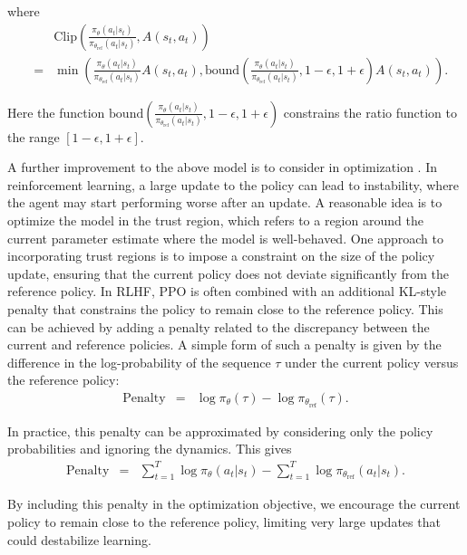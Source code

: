 \noindent where
\begin{eqnarray}
& & \mathrm{Clip}\left( \frac{\pi_{\theta}(a_t|s_t)}{\pi_{\theta_{\mathrm{ref}}}(a_t|s_t)}, A(s_t,a_t)\right) \nonumber \\
& = &  \min\left( \frac{\pi_{\theta}(a_t|s_t)}{\pi_{\theta_{\mathrm{ref}}}(a_t|s_t)} A(s_t,a_t),\mathrm{bound} \left(\frac{\pi_{\theta}(a_t|s_t)}{\pi_{\theta_{\mathrm{ref}}}(a_t|s_t)}, 1 - \epsilon, 1 + \epsilon \right) A(s_t,a_t) \right).
\end{eqnarray}

\noindent Here the function $\mathrm{bound}(\frac{\pi_{\theta}(a_t|s_t)}{\pi_{\theta_{\mathrm{ref}}}(a_t|s_t)}, 1 - \epsilon, 1 + \epsilon)$ constrains the ratio function to the range $[1-\epsilon, 1+\epsilon]$.

A further improvement to the above model is to consider  in optimization \cite{schulman-etal:2015trust}. In reinforcement learning, a large update to the policy can lead to instability, where the agent may start performing worse after an update. A reasonable idea is to optimize the model in the trust region, which refers to a region around the current parameter estimate where the model is well-behaved. One approach to incorporating trust regions is to impose a constraint on the size of the policy update, ensuring that the current policy does not deviate significantly from the reference policy. In RLHF, PPO is often combined with an additional KL-style penalty that constrains the policy to remain close to the reference policy. This can be achieved by adding a penalty related to the discrepancy between the current and reference policies. A simple form of such a penalty is given by the difference in the log-probability of the sequence $\tau$ under the current policy versus the reference policy:
\begin{eqnarray}
\mathrm{Penalty} & = & \log \pi_{\theta}(\tau) - \log \pi_{\theta_{\mathrm{ref}}}(\tau).
\end{eqnarray}

\noindent In practice, this penalty can be approximated by considering only the policy probabilities and ignoring the dynamics. This gives
\begin{eqnarray}
\mathrm{Penalty} & = & \sum_{t=1}^{T} \log \pi_{\theta}(a_t|s_t) - \sum_{t=1}^{T} \log \pi_{\theta_{\mathrm{ref}}}(a_t|s_t).
\end{eqnarray}

\noindent By including this penalty in the optimization objective, we encourage the current policy to remain close to the reference policy, limiting very large updates that could destabilize learning.

